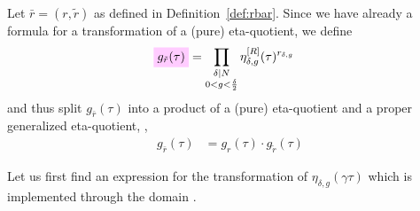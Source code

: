 \documentclass{article}
\begin{document}
Let $\bar{r} = (r, \tilde{r})$ as defined in
Definition~\ref{def:rbar}. Since we have already a formula for a
transformation of a (pure) eta-quotient, we
define
\begin{align}
  \defineNotation[g-rtilde-tau]{g_{\tilde{r}}(\tau)}
  &=
  \prod_{\substack{\divides{\delta}{N}\\0<g<\frac{\delta}{2}}}
  \eta_{\delta,g}^{[R]}(\tau)^{r_{\delta,g}}
\end{align}
and thus split $g_{\bar{r}}(\tau)$ into a product of a (pure)
eta-quotient and a proper generalized eta-quotient, \ie,
\begin{align*}
  g_{\bar{r}}(\tau)
  &=
    g_r(\tau) \cdot g_{\tilde{r}}(\tau)
\end{align*}


Let us first find an expression for the transformation of
$\eta_{\delta,g}(\gamma\tau)$ which is implemented through the domain
.
\end{document}
